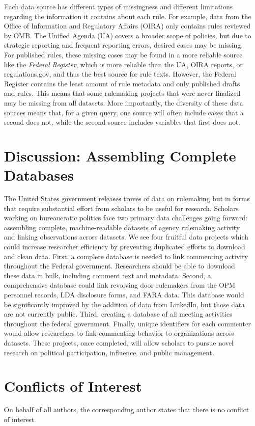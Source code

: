 \documentclass[
      12pt,
        ]{article}
\begin{document}
Each data source has different types of missingness and different
limitations regarding the information it contains about each rule. For
example, data from the Office of Information and Regulatory Affairs
(OIRA) only contains rules reviewed by OMB. The Unified Agenda (UA)
covers a broader scope of policies, but due to strategic reporting and
frequent reporting errors, desired cases may be missing. For published
rules, these missing cases may be found in a more reliable source like
the \emph{Federal Register}, which is more reliable than the UA, OIRA
reports, or regulations.gov, and thus the best source for rule texts.
However, the Federal Register contains the least amount of rule metadata
and only published drafts and rules. This means that some rulemaking
projects that were never finalized may be missing from all datasets.
More importantly, the diversity of these data sources means that, for a
given query, one source will often include cases that a second does not,
while the second source includes variables that first does not.

\hypertarget{discussion-assembling-complete-databases}{%
\section{Discussion: Assembling Complete
Databases}\label{discussion-assembling-complete-databases}}

The United States government releases troves of data on rulemaking but
in forms that require substantial effort from scholars to be useful for
research. Scholars working on bureaucratic politics face two primary
data challenges going forward: assembling complete, machine-readable
datasets of agency rulemaking activity and linking observations across
datasets. We see four fruitful data projects which could increase
researcher efficiency by preventing duplicated efforts to download and
clean data. First, a complete database is needed to link commenting
activity throughout the Federal government. Researchers should be able
to download these data in bulk, including comment text and metadata.
Second, a comprehensive database could link revolving door rulemakers
from the OPM personnel records, LDA disclosure forms, and FARA data.
This database would be significantly improved by the addition of data
from LinkedIn, but those data are not currently public. Third, creating
a database of all meeting activities throughout the federal government.
Finally, unique identifiers for each commenter would allow researchers
to link commenting behavior to organizations across datasets. These
projects, once completed, will allow scholars to pursue novel research
on political participation, influence, and public management.

\hypertarget{conflicts-of-interest}{%
\section{Conflicts of Interest}\label{conflicts-of-interest}}

On behalf of all authors, the corresponding author states that there is
no conflict of interest.
  \newpage 
  \theendnotes
\newpage
\singlespacing 
           
  
\end{document}
